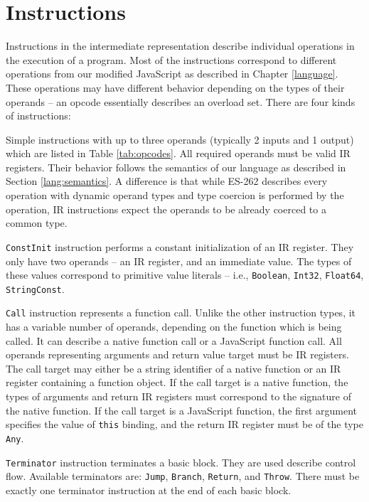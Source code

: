 \section{Instructions}

Instructions in the intermediate representation describe individual operations in the execution of a program. Most of the instructions correspond to different operations from our modified JavaScript as described in Chapter \ref{language}. These operations may have different behavior depending on the types of their operands -- an opcode essentially describes an overload set. There are four kinds of instructions:

Simple instructions with up to three operands (typically 2 inputs and 1 output) which are listed in Table \ref{tab:opcodes}. All required operands must be valid IR registers. Their behavior follows the semantics of our language as described in Section \ref{lang:semantics}. A difference is that while ES-262 \cite{ecma262} describes every operation with dynamic operand types and type coercion is performed by the operation, IR instructions expect the operands to be already coerced to a common type.

\texttt{ConstInit} instruction performs a constant initialization of an IR register. They only have two operands -- an IR register, and an immediate value. The types of these values correspond to primitive value literals -- i.e., \texttt{Boolean}, \texttt{Int32}, \texttt{Float64}, \texttt{StringConst}.

\texttt{Call} instruction represents a function call. Unlike the other instruction types, it has a variable number of operands, depending on the function which is being called. It can describe a native function call or a JavaScript function call. All operands representing arguments and return value target must be IR registers. The call target may either be a string identifier of a native function or an IR register containing a function object. If the call target is a native function, the types of arguments and return IR registers must correspond to the signature of the native function. If the call target is a JavaScript function, the first argument specifies the value of \texttt{this} binding, and the return IR register must be of the type \texttt{Any}.

\texttt{Terminator} instruction terminates a basic block. They are used describe control flow. Available terminators are: \texttt{Jump}, \texttt{Branch}, \texttt{Return}, and \texttt{Throw}. There must be exactly one terminator instruction at the end of each basic block.


